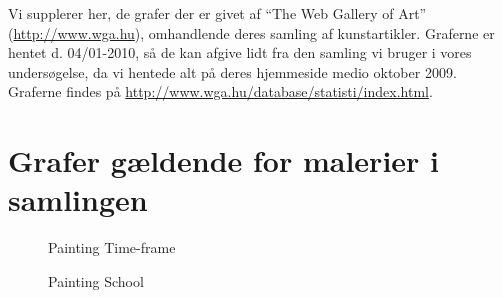{
Vi supplerer her, de grafer der er givet af ``The Web Gallery of Art''
(\url{http://www.wga.hu}), omhandlende deres samling
af kunstartikler. Graferne er hentet d. 04/01-2010, så de kan afgive
lidt fra den samling vi bruger i vores undersøgelse, da vi hentede alt
på deres hjemmeside medio oktober 2009. Graferne findes på
\url{http://www.wga.hu/database/statisti/index.html}.

\section{Grafer gældende for malerier i samlingen}
\begin{figure}[H]
    \setlength\fboxsep{0pt}
    \setlength\fboxrule{0.5pt}
    \centering
    \caption[]{Painting Time-frame}
    \label{painting_timeframe}
\end{figure}

\begin{figure}[H]
    \setlength\fboxsep{0pt}
    \setlength\fboxrule{0.5pt}
    \centering
    \caption[]{Painting School}
    \label{painting_school}
\end{figure}

}
